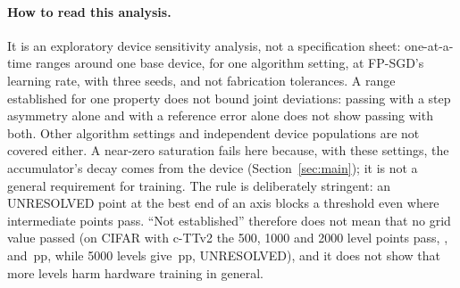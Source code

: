 \paragraph{How to read this analysis.} It is an exploratory device sensitivity analysis, not a specification sheet:
one-at-a-time ranges around one base device, for one algorithm setting, at FP-SGD's learning rate, with three seeds, and
not fabrication tolerances. A range established for one property does not bound joint deviations: passing with a step
asymmetry alone and with a reference error alone does not show passing with both. Other algorithm settings and independent
device populations are not covered either. A near-zero saturation fails here because, with these settings,
the accumulator's decay comes from the device (Section~\ref{sec:main}); it is not a general requirement for training. The rule
is deliberately stringent: an UNRESOLVED point at the best end of an axis blocks a threshold even where intermediate points pass.
``Not established'' therefore does not mean that no grid value passed (on CIFAR with c-TTv2 the 500, 1000 and 2000 level points
pass, \RVSpecCttvTwoCifarNStatesAtFiveZeroZeroPZeroGap, \RVSpecCttvTwoCifarNStatesAtOneZeroZeroZeroGap{} and
\RVSpecCttvTwoCifarNStatesAtTwoZeroZeroZeroPZeroGap\,pp, while 5000 levels give \RVSpecCttvTwoCifarNStatesAtFiveZeroZeroZeroPZeroGap\,pp,
UNRESOLVED), and it does not show that more levels harm hardware training in general.

